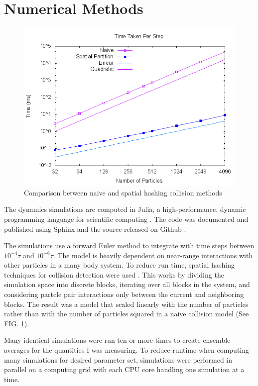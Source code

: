 \documentclass[aps,prb,twocolumn,groupedaddress,nofootinbib,floatfix]{revtex4}
\begin{document}
\section{Numerical Methods}

\begin{figure}
  \includegraphics[width=\columnwidth]{images/compare.png}
  \caption{Comparison between naive and spatial hashing collision methods}
  \label{fig:compare}
\end{figure}

The dynamics simulations are computed in Julia, a high-performance, dynamic 
programming language for scientific computing \cite{Bezanson1,Bezanson2}.
The code was documented and published using Sphinx \cite{RTD} and the source released on Github \cite{github}.

The simulations use a forward Euler method to integrate with time steps between $10^{-4}\tau$ and $10^{-6}\tau$.
The model is heavily dependent on near-range interactions with other particles in a many body system.
To reduce run time, spatial hashing techniques for collision detection were used \cite{Muller}.
This works by dividing the simulation space into discrete blocks, iterating over all blocks in the system, and considering partcle pair interactions only between the current and neighboring blocks.
The result was a model that scaled linearly with the number of particles rather than with the number of particles squared in a naive collision model (See FIG. \ref{fig:compare}).

Many identical simulations were run ten or more times to create ensemble averages for the quantities I was measuring.
To reduce runtime when computing many simulations for desired parameter set, simulations were performed in parallel on a computing grid with each CPU core handling one simulation at a time.
\end{document}
